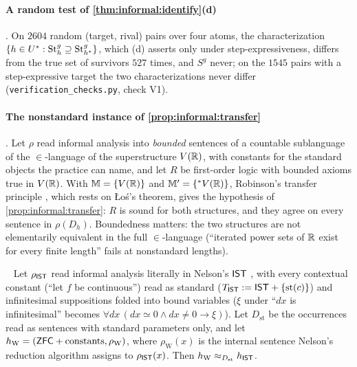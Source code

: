 \paragraph{A random test of \cref{thm:informal:identify}(d)} . On $2604$ random (target, rival) pairs over four atoms, the characterization $\{h\in U^*:\mathrm{St}^{g}_{h}\supseteq\mathrm{St}^{g}_{h^*}\}$, which (d) asserts only under step-expressiveness, differs from the true set of survivors $527$ times, and $S^g$ never; on the $1545$ pairs with a step-expressive target the two characterizations never differ (\texttt{verification\_checks.py}, check V1).

\paragraph{The nonstandard instance of \cref{prop:informal:transfer}} . Let $\rho$ read informal analysis into \emph{bounded} sentences of a countable sublanguage of the $\in$-language of the superstructure $V(\mathbb{R})$, with constants for the standard objects the practice can name, and let $R$ be first-order logic with bounded axioms true in $V(\mathbb{R})$. With $\mathbb M=\{V(\mathbb{R})\}$ and $\mathbb M'=\{{}^*V(\mathbb{R})\}$, Robinson's transfer principle \citep{robinson1966nonstandard}, which rests on Łoś's theorem, gives the hypothesis of \cref{prop:informal:transfer}: $R$ is sound for both structures, and they agree on every sentence in $\rho(D_h)$. Boundedness matters: the two structures are not elementarily equivalent in the full $\in$-language (``iterated power sets of $\mathbb{R}$ exist for every finite length'' fails at nonstandard lengths).

\begin{proposition}\ \label{prop:informal:ist}
Let $\rho_{\mathsf{IST}}$ read informal analysis literally in Nelson's $\mathsf{IST}$ \citep{nelson1977internal}, with every contextual constant (``let $f$ be continuous'') read as standard ($T_{\mathsf{IST}}:=\mathsf{IST}+\{\mathrm{st}(c)\}$) and infinitesimal suppositions folded into bound variables ($\xi$ under ``$dx$ is infinitesimal'' becomes $\forall dx\,(dx\simeq0\wedge dx\ne0\to\xi)$). Let $D_{\mathrm{st}}$ be the occurrences read as sentences with standard parameters only, and let $h_{\mathrm W}=(\mathsf{ZFC}+\text{constants},\rho_{\mathrm W})$, where $\rho_{\mathrm W}(x)$ is the internal sentence Nelson's reduction algorithm assigns to $\rho_{\mathsf{IST}}(x)$. Then $h_{\mathrm W}\approx_{D_{\mathrm{st}}}h_{\mathsf{IST}}$.
\end{proposition}

